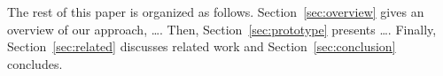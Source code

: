 

The rest of this paper is organized as follows.
Section~\ref{sec:overview} gives an overview of our approach, \ldots.
Then, Section~\ref{sec:prototype} presents \ldots. Finally,
Section~\ref{sec:related} discusses related work and
Section~\ref{sec:conclusion} concludes.



